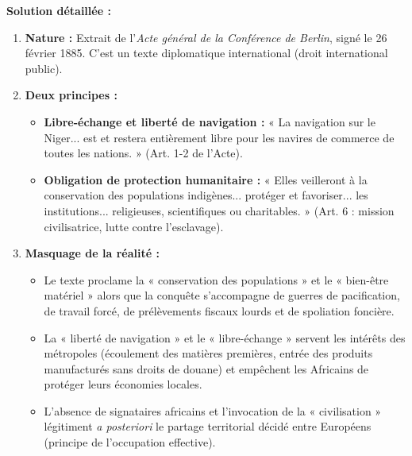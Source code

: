 \documentclass[11pt]{article}
\newcounter{popsec}
\newcounter{popsub}
\newcommand{\courssub}[1]{%
  \stepcounter{popsub}%
  \par\vspace{9pt}\noindent{\popxbold\fontsize{11.5}{13}\selectfont\color{popink}{\color{poporange}\thepopsec.\thepopsub}\hspace{6pt}#1}\par\nopagebreak\vspace{4pt}
}
\begin{document}
\begin{exoresolu}
\textbf{Solution détaillée :}
\begin{enumerate}
    \item \textbf{Nature :} Extrait de l'\emph{Acte général de la Conférence de Berlin}, signé le 26 février 1885. C'est un texte diplomatique international (droit international public).
    \item \textbf{Deux principes :}
        \begin{itemize}
            \item \textbf{Libre-échange et liberté de navigation :} « La navigation sur le Niger... est et restera entièrement libre pour les navires de commerce de toutes les nations. » (Art. 1-2 de l'Acte).
            \item \textbf{Obligation de protection humanitaire :} « Elles veilleront à la conservation des populations indigènes... protéger et favoriser... les institutions... religieuses, scientifiques ou charitables. » (Art. 6 : mission civilisatrice, lutte contre l'esclavage).
        \end{itemize}
    \item \textbf{Masquage de la réalité :}
        \begin{itemize}
            \item Le texte proclame la « conservation des populations » et le « bien-être matériel » alors que la conquête s'accompagne de guerres de pacification, de travail forcé, de prélèvements fiscaux lourds et de spoliation foncière.
            \item La « liberté de navigation » et le « libre-échange » servent les intérêts des métropoles (écoulement des matières premières, entrée des produits manufacturés sans droits de douane) et empêchent les Africains de protéger leurs économies locales.
            \item L'absence de signataires africains et l'invocation de la « civilisation » légitiment \emph{a posteriori} le partage territorial décidé entre Européens (principe de l'occupation effective).
        \end{itemize}
\end{enumerate}
\end{exoresolu}

\courssub{Synthèse de la section}
\end{document}
